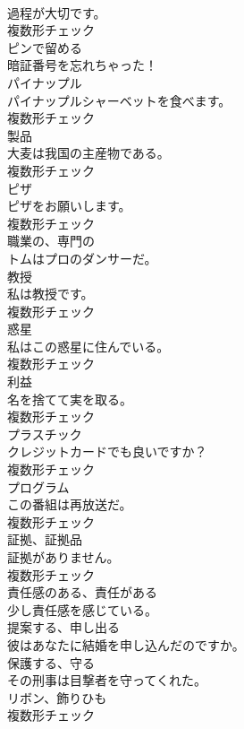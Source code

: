 \documentclass[8pt]{extreport}
\begin{document}
\begin{CJK}{UTF8}{min}
\\	過程が大切です。	
\\	複数形チェック
\\	[動詞]	ピンで留める	
\\	暗証番号を忘れちゃった！	
\\	[名詞]	パイナップル	
\\	パイナップルシャーベットを食べます。	
\\	複数形チェック
\\	[名詞]	製品	
\\	大麦は我国の主産物である。	
\\	複数形チェック
\\	[名詞]	ピザ	
\\	ピザをお願いします。	
\\	複数形チェック
\\	[形容詞]	職業の、専門の	
\\	トムはプロのダンサーだ。	
\\	[名詞]	教授	
\\	私は教授です。	
\\	複数形チェック
\\	[名詞]	惑星	
\\	私はこの惑星に住んでいる。	
\\	複数形チェック
\\	[名詞]	利益	
\\	名を捨てて実を取る。	
\\	複数形チェック
\\	[名詞]	プラスチック	
\\	クレジットカードでも良いですか？	
\\	複数形チェック
\\	[名詞]	プログラム	
\\	この番組は再放送だ。	
\\	複数形チェック
\\	[名詞]	証拠、証拠品	
\\	証拠がありません。	
\\	複数形チェック
\\	[形容詞]	責任感のある、責任がある	
\\	少し責任感を感じている。	
\\	[動詞]	提案する、申し出る	
\\	彼はあなたに結婚を申し込んだのですか。	
\\	[動詞]	保護する、守る	
\\	その刑事は目撃者を守ってくれた。	
\\	[名詞]	リボン、飾りひも	
\\	複数形チェック

\end{CJK}
\end{document}
